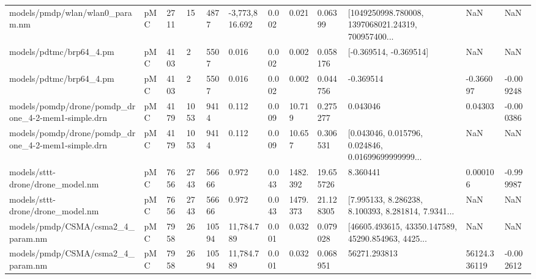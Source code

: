 \begin{tabular}{llllllllllll}
                   models/pmdp/wlan/wlan0\_param.nm &  pMC &   2711 &         15 &        4877 & -3,773,816.692 &            0.002 &                        0.021 &        0.06399 & [1049250998.780008, 1397068021.24319, 700957400... &                NaN &          NaN \\
                           models/pdtmc/brp64\_4.pm &  pMC &   4103 &          2 &        5507 &          0.016 &            0.002 &                        0.002 &       0.058176 &                             [-0.369514, -0.369514] &                NaN &          NaN \\
                           models/pdtmc/brp64\_4.pm &  pMC &   4103 &          2 &        5507 &          0.016 &            0.002 &                        0.002 &       0.044756 &                                          -0.369514 &          -0.366097 &    -0.009248 \\
models/pomdp/drone/pomdp\_drone\_4-2-mem1-simple.drn &  pMC &   4179 &       1053 &        9414 &          0.112 &            0.009 &                       10.719 &       0.275277 &                                           0.043046 &            0.04303 &    -0.000386 \\
models/pomdp/drone/pomdp\_drone\_4-2-mem1-simple.drn &  pMC &   4179 &       1053 &        9414 &          0.112 &            0.009 &                       10.657 &       0.306531 & [0.043046, 0.015796, 0.024846, 0.01699699999999... &                NaN &          NaN \\
                  models/sttt-drone/drone\_model.nm &  pMC &   7656 &       2743 &       56666 &          0.972 &            0.043 &                     1482.392 &      19.655726 &                                           8.360441 &           0.000106 &    -0.999987 \\
                  models/sttt-drone/drone\_model.nm &  pMC &   7656 &       2743 &       56666 &          0.972 &            0.043 &                     1479.373 &      21.128305 & [7.995133, 8.286238, 8.100393, 8.281814, 7.9341... &                NaN &          NaN \\
                 models/pmdp/CSMA/csma2\_4\_param.nm &  pMC &   7958 &         26 &       10594 &     11,784.789 &            0.001 &                        0.032 &       0.079028 & [46605.493615, 43350.147589, 45290.854963, 4425... &                NaN &          NaN \\
                 models/pmdp/CSMA/csma2\_4\_param.nm &  pMC &   7958 &         26 &       10594 &     11,784.789 &            0.001 &                        0.032 &       0.068951 &                                       56271.293813 &       56124.336119 &    -0.002612 \\

\end{tabular}
